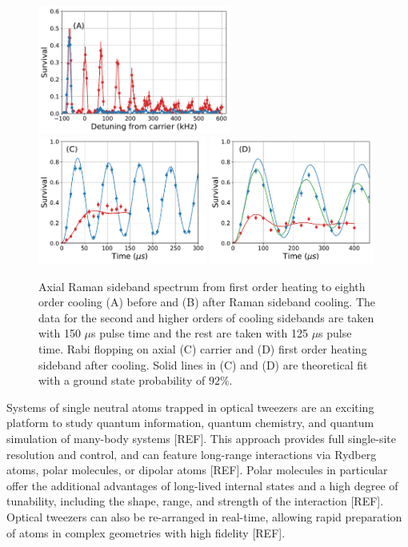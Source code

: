 \documentclass[aps,prl,twocolumn,groupedaddress]{revtex4-1}
\begin{document}
\begin{figure}
  \includegraphics[height=4.2cm]{imgs/spectrum_a1.pdf}
  \includegraphics[height=4.2cm]{imgs/rabi_flop_a1_0.pdf}
  \includegraphics[height=4.2cm]{imgs/rabi_flop_a1_p1.pdf}
  \caption{Axial Raman sideband spectrum from first order heating to eighth order cooling
    (A) before and (B) after Raman sideband cooling.
    The data for the second and higher orders of cooling sidebands are taken with 150 $\mu$s
    pulse time and the rest are taken with 125 $\mu$s pulse time.
    Rabi flopping on axial (C) carrier and (D) first order heating sideband
    after cooling.
    Solid lines in (C) and (D) are theoretical fit with a ground state probability of $92\%$.
    \label{f-axial}}
\end{figure}

Systems of single neutral atoms trapped in optical tweezers are an exciting platform to study quantum information, quantum chemistry,
and quantum simulation of many-body systems [REF].
This approach provides full single-site resolution and control, and can feature long-range interactions via Rydberg atoms,
polar molecules, or dipolar atoms [REF].
Polar molecules in particular offer the additional advantages of long-lived internal states and a high degree of tunability,
including the shape, range, and strength of the interaction [REF].
Optical tweezers can also be re-arranged in real-time, allowing rapid preparation of atoms in complex geometries with high fidelity [REF].
\end{document}
